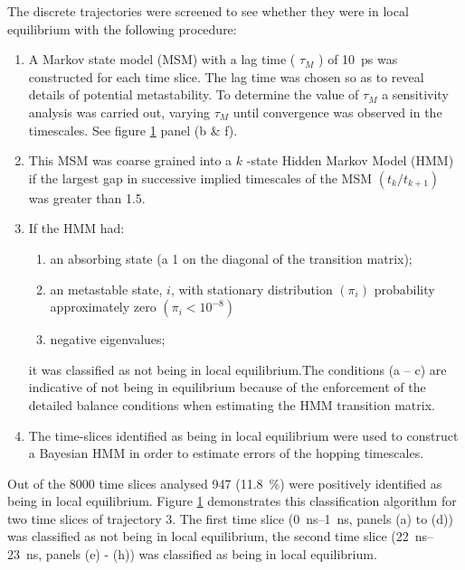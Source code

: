 \begin{figure}[p]
    \label{fig:wat_s10}
\end{figure}

The discrete trajectories were screened to see whether they were in local equilibrium with the following procedure:
\begin{enumerate}
    \item A Markov state model (MSM) with a lag time ( $\tau_{M}$ ) of \SI{10}{\pico\second} was constructed for each time slice. The lag time was chosen so as to reveal details of potential metastability\cite{prinzMarkovModelsMolecular2011}. To determine the value of $\tau_{M}$  a sensitivity analysis was carried out, varying $\tau_{M}$ until convergence was observed  in the timescales. See figure \ref{fig:wat_s10} panel (b \& f).
    \item This MSM was coarse grained into a $k$ -state Hidden Markov Model (HMM) if the largest gap in successive implied timescales of the MSM $\left(t_{k} / t_{k+1}\right)$ was greater than \num{1.5}. 
    \item If the HMM had:
    \begin{enumerate}
        \item an absorbing state (a \num{1} on the diagonal of the transition matrix);
        \item an metastable state, $i$, with stationary distribution $\left(\pi_{i}\right)$ probability approximately zero $\left(\pi_{i}< 10^{-8}\right)$
        \item negative eigenvalues; 
    \end{enumerate}
    it was classified as not being in local equilibrium.The conditions (a – c) are indicative of not being in equilibrium because of the enforcement of the detailed balance conditions when estimating the HMM transition matrix\cite{noeProjectedHiddenMarkov2013a}.
    \item The time-slices identified as being in local equilibrium were used to construct a Bayesian HMM in order to estimate errors of the hopping timescales. 
\end{enumerate}

Out of the \num{8000} time slices analysed \num{947} (\SI{11.8}{\percent}) were positively identified as being in local equilibrium. Figure \ref{fig:wat_s10} demonstrates this classification algorithm for two time slices of trajectory \num{3}. The first time slice (\SIrange{0}{1}{\nano\second}, panels (a) to (d)) was classified as not being in local equilibrium, the second time slice (\SIrange{22}{23}{\nano\second}, panels (e) - (h)) was classified as being in local equilibrium.

